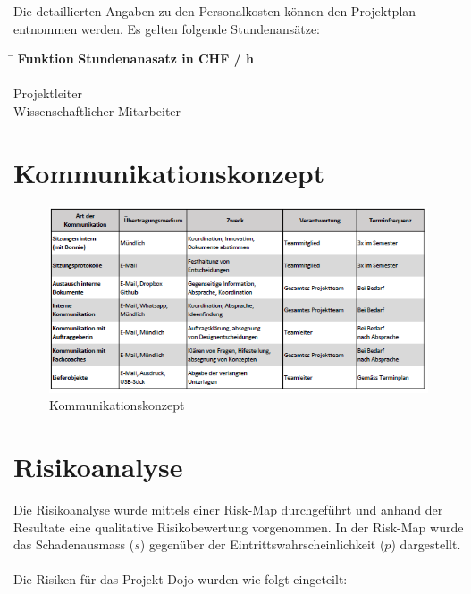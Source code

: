 \documentclass[10pt,a4paper,oneside]{99_fhnwreport}
\begin{document}
\noindent
Die detaillierten Angaben zu den Personalkosten können den Projektplan entnommen werden. Es gelten folgende Stundenansätze:

\begin{tabbing}
\hspace{80mm}			\= 	\hspace{10mm} 	\kill
\textbf{Funktion}		\> \textbf{Stundenanasatz in CHF / h} \\
\> \\
Projektleiter 			 	\\
Wissenschaftlicher Mitarbeiter 		\\
\end{tabbing}
\newpage

\section{Kommunikationskonzept \label{sec:kommunikationskonzept}}

\begin{figure}[htbp]
	\centering
	\includegraphics[width=\textwidth]{Kommunikationskonzept.png}
	\caption{Kommunikationskonzept}
\end{figure}

\section{Risikoanalyse}\label{sec:risikoanalyse}
Die Risikoanalyse wurde mittels einer Risk-Map durchgeführt und anhand der Resultate eine qualitative Risikobewertung vorgenommen. In der Risk-Map wurde das Schadenausmass ($s$) gegenüber der Eintrittswahrscheinlichkeit ($p$) dargestellt.\\
\\
Die Risiken für das Projekt Dojo wurden wie folgt eingeteilt:
\end{document}
